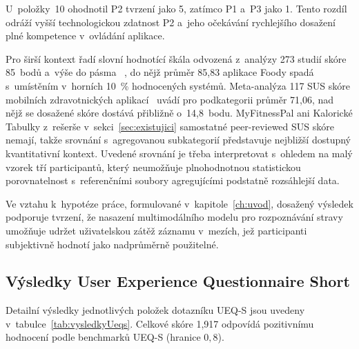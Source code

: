 U~položky~10 ohodnotil P2 tvrzení jako 5, zatímco P1 a~P3 jako 1. Tento rozdíl odráží vyšší technologickou zdatnost P2 a~jeho očekávání rychlejšího dosažení plné kompetence v~ovládání aplikace.

Pro širší kontext řadí slovní hodnotící škála odvozená z~analýzy 273 studií skóre 85~bodů a~výše do pásma ~\cite{bangor2008susAdjective}, do nějž průměr 85,83 aplikace Foody spadá s~umístěním v~horních 10~\% hodnocených systémů.
Meta-analýza 117 SUS skóre mobilních zdravotnických aplikací~\cite{hyzy2022susDigitalHealth} uvádí pro podkategorii  průměr 71,06, nad nějž se dosažené skóre dostává přibližně o~14,8~bodu.
MyFitnessPal ani Kalorické Tabulky z~rešerše v~sekci~\ref{sec:existujici} samostatné peer-reviewed SUS skóre nemají, takže srovnání s~agregovanou subkategorií představuje nejbližší dostupný kvantitativní kontext.
Uvedené srovnání je třeba interpretovat s~ohledem na malý vzorek tří participantů, který neumožňuje plnohodnotnou statistickou porovnatelnost s~referenčními soubory agregujícími podstatně rozsáhlejší data.

Ve vztahu k~hypotéze práce, formulované v~kapitole~\ref{ch:uvod}, dosažený výsledek podporuje tvrzení, že nasazení multimodálního modelu pro rozpoznávání stravy umožňuje udržet uživatelskou zátěž záznamu v~mezích, jež participanti subjektivně hodnotí jako nadprůměrně použitelné.

\subsection{Výsledky User Experience Questionnaire Short}
\label{subsec:vysledkyUeqs}

Detailní výsledky jednotlivých položek dotazníku UEQ-S jsou uvedeny v~tabulce~\ref{tab:vysledkyUeqs}.
Celkové skóre 1,917 odpovídá pozitivnímu hodnocení podle benchmarků UEQ-S (hranice $0,8$).

